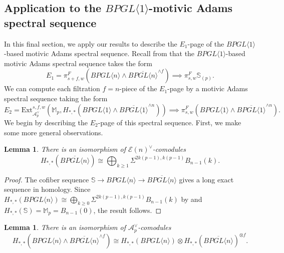 \documentclass{amsart}
\newtheorem{lemma}[theorem]{Lemma}
\theoremstyle{plain}
\numberwithin{theorem}{section}
\numberwithin{equation}{section}
\numberwithin{figure}{section}
\newcommand{\0}{\langle 0 \rangle }
\begin{document}
\subsection{Application to the $BPGL \langle 1 \rangle$-motivic Adams spectral sequence} 
In this final section, we apply our results to describe the $E_1$-page of the $BPGL \langle 1 \rangle$-based motivic Adams spectral sequence. Recall from  that the $BPGL \langle 1 \rangle$-based motivic Adams spectral sequence takes the form
\[E_1=\pi^F_{s+f, w}(BPGL \langle n \rangle \wedge \overline{BPGL \langle n \rangle}^{\wedge f}) \implies \pi^F_{s,w}\mathbb{S}_{(p)}.\]
We can compute each filtration $f=n$-piece of the $E_1$-page by a motivic Adams spectral sequence taking the form
\[E_2 = \text{Ext}_{\mathcal{A}^\vee_p}^{s,f,w}\left(\mathbb{M}_p, H_{*,*}(BPGL \langle 1 \rangle \wedge \overline{BPGL \langle 1 \rangle}^{\wedge n})\right) \implies \pi_{s,w}^{F}(BPGL \langle 1 \rangle \wedge \overline{BPGL \langle 1 \rangle} ^{\wedge n}).\]
We begin by describing the $E_2$-page of this spectral sequence. First, we make some more general observations.
\begin{lemma}
\label{lemma:BpglnBarHomology}
    There is an isomorphism of $\mathcal{E}(n)^\vee$-comodules
    \[H_{*,*}(\overline{BPGL \langle n \rangle}) \cong \bigoplus_{k\geq 1}\Sigma^{2k(p-1), k(p-1)}B_{n-1}(k).\]
\end{lemma}

\begin{proof}
    The cofiber sequence $\mathbb{S} \to BPGL \langle n \rangle \to \overline{BPGL \langle n \rangle}$ gives a long exact sequence in homology. Since $H_{*,*}(BPGL \langle n \rangle) \cong \bigoplus_{k \geq 0}\Sigma^{2k(p-1), k(p-1)}B_{n-1}(k)$ by  and $H_{*,*}(\mathbb{S}) = \mathbb{M}_p = B_{n-1}(0)$, the result follows.
\end{proof}


\begin{lemma}
\label{lemma:BigKunneth}
    There is an isomorphism of $\mathcal{A}^\vee_p$-comodules
    \[H_{*,*}(BPGL \langle n \rangle \wedge \overline{BPGL \langle n \rangle}^{\wedge f}) \cong H_{*,*}(BPGL \langle n \rangle) \otimes H_{*,*}(\overline{BPGL\langle n \rangle})^{\otimes f}.\]
\end{lemma}
\end{document}
